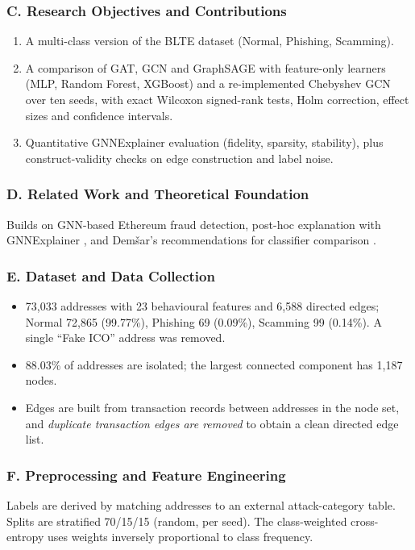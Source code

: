 \documentclass[11pt,a4paper]{article}
\begin{document}
\subsubsection*{C. Research Objectives and Contributions}
\begin{enumerate}[leftmargin=*]
    \item A multi-class version of the BLTE dataset (Normal, Phishing, Scamming).
    \item A comparison of GAT, GCN and GraphSAGE with feature-only learners (MLP, Random Forest, XGBoost) and a re-implemented Chebyshev GCN over ten seeds, with exact Wilcoxon signed-rank tests, Holm correction, effect sizes and confidence intervals.
    \item Quantitative GNNExplainer evaluation (fidelity, sparsity, stability), plus construct-validity checks on edge construction and label noise.
\end{enumerate}

\subsubsection*{D. Related Work and Theoretical Foundation}
Builds on GNN-based Ethereum fraud detection, post-hoc explanation with GNNExplainer \cite{ying2019gnnexplainer}, and Dem\v{s}ar's recommendations for classifier comparison \cite{demsar2006statistical}.

\subsubsection*{E. Dataset and Data Collection}
\begin{itemize}[leftmargin=*]
    \item 73,033 addresses with 23 behavioural features and 6,588 directed edges; Normal 72,865 (99.77\%), Phishing 69 (0.09\%), Scamming 99 (0.14\%). A single ``Fake ICO'' address was removed.
    \item 88.03\% of addresses are isolated; the largest connected component has 1,187 nodes.
    \item Edges are built from transaction records between addresses in the node set, and \emph{duplicate transaction edges are removed} to obtain a clean directed edge list.
\end{itemize}

\subsubsection*{F. Preprocessing and Feature Engineering}
Labels are derived by matching addresses to an external attack-category table. Splits are stratified 70/15/15 (random, per seed). The class-weighted cross-entropy uses weights inversely proportional to class frequency.
\end{document}
